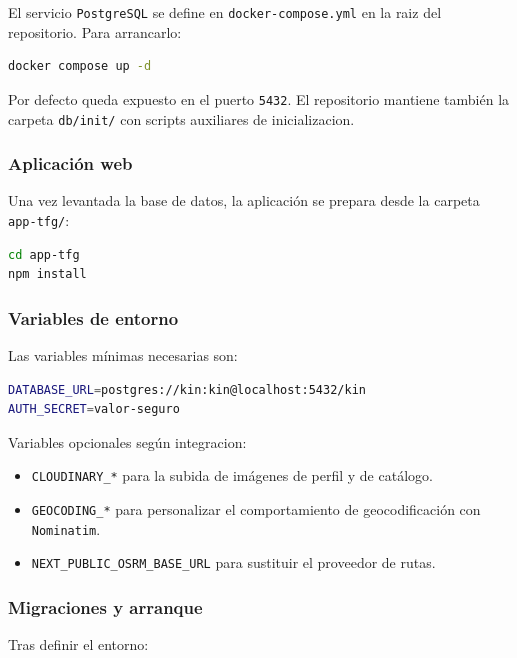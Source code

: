 El servicio \texttt{PostgreSQL} se define en \texttt{docker-compose.yml} en la raiz del repositorio. Para arrancarlo:

\begin{lstlisting}[language=bash]
docker compose up -d
\end{lstlisting}

Por defecto queda expuesto en el puerto \texttt{5432}. El repositorio mantiene también la carpeta \texttt{db/init/} con scripts auxiliares de inicializacion.

\subsubsection*{Aplicación web}

Una vez levantada la base de datos, la aplicación se prepara desde la carpeta \texttt{app-tfg/}:

\begin{lstlisting}[language=bash]
cd app-tfg
npm install
\end{lstlisting}

\subsubsection*{Variables de entorno}

Las variables mínimas necesarias son:

\begin{lstlisting}[language=bash]
DATABASE_URL=postgres://kin:kin@localhost:5432/kin
AUTH_SECRET=valor-seguro
\end{lstlisting}

Variables opcionales según integracion:

\begin{itemize}
    \item \texttt{CLOUDINARY\_*} para la subida de imágenes de perfil y de catálogo.
    \item \texttt{GEOCODING\_*} para personalizar el comportamiento de geocodificación con \texttt{Nominatim}.
    \item \texttt{NEXT\_PUBLIC\_OSRM\_BASE\_URL} para sustituir el proveedor de rutas.
\end{itemize}

\subsubsection*{Migraciones y arranque}

Tras definir el entorno:

